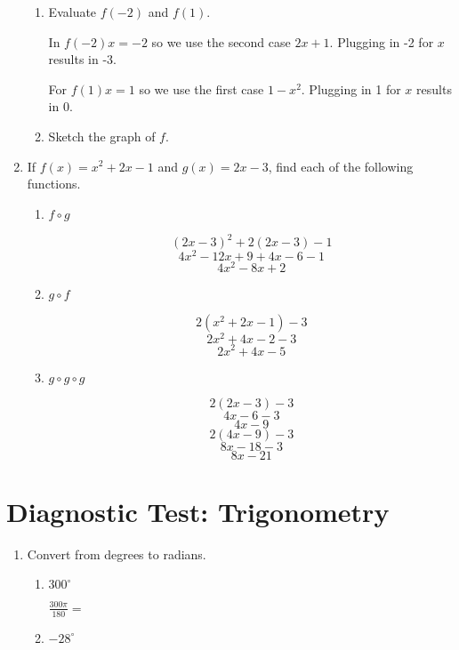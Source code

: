 \documentclass{article}
\begin{document}
\begin{enumerate}
	\begin{enumerate}
		\item Evaluate $f(-2)$ and $f(1)$.

		In $f(-2) x = -2$ so we use the second case $2x + 1$. Plugging in -2 for $x$ results in -3.

		For $f(1) x = 1$ so we use the first case $ 1 - x^{2} $. Plugging in 1 for $x$ results in 0.

		\item Sketch the graph of $f$.
	\end{enumerate}

	\item If $ f(x) = x^2 + 2x - 1$ and $g(x) = 2x - 3$, find each of the following functions.

	\begin{enumerate}
		\item $f \circ g$

			$$ (2x - 3)^ 2 + 2(2x-3) - 1 $$
			$$ 4x^2 - 12x + 9 + 4x - 6 - 1$$
			$$ 4x^2 - 8x + 2 $$

		\item $g \circ f$

			$$ 2(x^2 + 2x - 1) - 3$$
			$$ 2x^2 + 4x - 2 - 3$$
			$$ 2x^2 +4x -5 $$

		\item $g \circ g \circ g$

			$$ 2(2x - 3) - 3$$
			$$ 4x - 6 - 3 $$
			$$ 4x - 9 $$
			$$ 2(4x - 9) - 3 $$
			$$ 8x - 18 - 3 $$
			$$ 8x - 21 $$
	\end{enumerate}
\end{enumerate}

\newpage

\section{Diagnostic Test: Trigonometry}

\begin{enumerate}
	\item Convert from degrees to radians.
	\begin{enumerate}
		\item $300^{\circ}$

			$\frac{300\pi}{180} = $
		\item $ - 28^{\circ}$
	\end{enumerate}
\end{enumerate}
\end{document}
